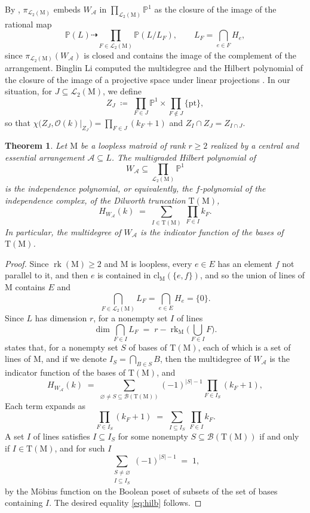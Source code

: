 \documentclass[11pt,a4paper,reqno]{amsart}
\theoremstyle{results}
\theoremstyle{definitions}
\def\P{\mathbb{P}}
\def\calA{\mathcal{A}}
\def\calB{\mathcal{B}}
\newcommand{\cl}{\textrm{cl}}
\newcommand{\rk}{\operatorname{rk}}
\newcommand{\M}{\mathrm{M}}
\renewcommand{\emptyset}{\varnothing}
\newtheorem{theorem}[thm]{Theorem}
\newcommand{\cO}{\mathcal{O}}
\newcommand{\Lines}{\mathcal{L}_2}
\newcommand{\DT}{\mathrm{T}}      %
\begin{document}
By , $\pi_{\Lines(\M)}$ embeds $W_{\calA}$ in
$\prod_{\Lines(\M)}\P^1$ as the closure of the image of the rational map
\[
  \P(L) \dashrightarrow \prod_{F \in \Lines(\M)} \P(L/L_F), \qquad
  L_F = \bigcap_{e \in F} H_e ,
\]
since $\pi_{\Lines(\M)}(W_{\calA})$ is closed and contains the image of the
complement of the arrangement.  Binglin Li computed the multidegree and the Hilbert
polynomial of the closure of the image of a projective space under linear
projections \cite[Theorem 1.1]{li2018images}.  In our situation, for $J \subseteq \Lines(\M)$, we define
\[
  Z_J \;\coloneqq\; \prod_{F \in J}\P^1 \times \prod_{F \notin J}\{\mathrm{pt}\},
\]
so that $\chi\big(Z_J, \cO(k)|_{Z_J}\big) = \prod_{F \in J}(k_F+1)$ and
$Z_I \cap Z_J = Z_{I \cap J}$.

\begin{samepage}
\begin{theorem}\label{thm:li}
  Let $\M$ be a loopless matroid of rank $r \geqslant 2$ realized by a central and essential arrangement
  $\calA \subseteq L$.  The multigraded Hilbert polynomial of
  \[
  W_{\calA} \subseteq \prod_{\Lines(\M)}\P^1
  \] is the independence
  polynomial, or equivalently, the $f$-polynomial of the independence complex, of the Dilworth truncation $\DT(\M)$,
  \begin{equation}\label{eq:hilb}
    H_{W_{\calA}}(k) \;=\; \sum_{I \in \DT(\M)}\ \prod_{F \in I} k_F.
  \end{equation}
  In particular, the multidegree of $W_{\calA}$ is the indicator function of the bases of
  $\DT(\M)$.
\end{theorem}
\end{samepage}

\begin{proof}
  Since $\rk(\M) \geqslant 2$ and $\M$ is loopless, every $e \in E$ has
  an element $f$ not parallel to it, and then $e$ is contained in
  $\cl_{\M}(\{e, f\})$, and so the union of lines of $\M$ contains $E$ and
  \[
  \bigcap_{F \in \Lines(\M)} L_F = \bigcap_{e \in E} H_e = \{0\}.
  \]
  Since $L$ has dimension $r$, for a nonempty set $I$ of lines
  \[
    \dim \bigcap_{F \in I} L_F \;=\; r - \rk_{\M}\Big(\bigcup_{F \in I} F \Big) .
  \]
  \cite[Theorem 1.1]{li2018images} states that, for a nonempty set $S$ of bases of $\DT(\M)$, each of which is a set of lines of $\M$,
  and if we denote $I_S = \bigcap_{B \in S} B$, then the multidegree of $W_{\calA}$ is the indicator
  function of the bases of $\DT(\M)$, and
  \[
    H_{W_{\calA}}(k) \;=\; \sum_{\emptyset \ne S \subseteq \mathcal B(\DT(\M))}
      (-1)^{|S|-1} \prod_{F \in I_S} (k_F + 1) ,
  \]
  Each term expands as
  \[
    \prod_{F \in I_S} (k_F + 1) \;=\; \sum_{I \subseteq I_S}\ \prod_{F \in I} k_F .
  \]
  A set $I$ of lines satisfies $I \subseteq I_S$ for some nonempty $S \subseteq \calB(\DT(\M))$ if and only
  if $I \in \DT(\M)$, and for such $I$
  \[
    \sum_{\substack{S \ne \emptyset \\ I \subseteq I_S}} (-1)^{|S|-1} \;=\; 1 ,
  \]
  by the M\"{o}bius function on the Boolean poset of subsets of the set of bases
  containing $I$.  The desired equality
  \eqref{eq:hilb} follows.
\end{proof}
\end{document}
